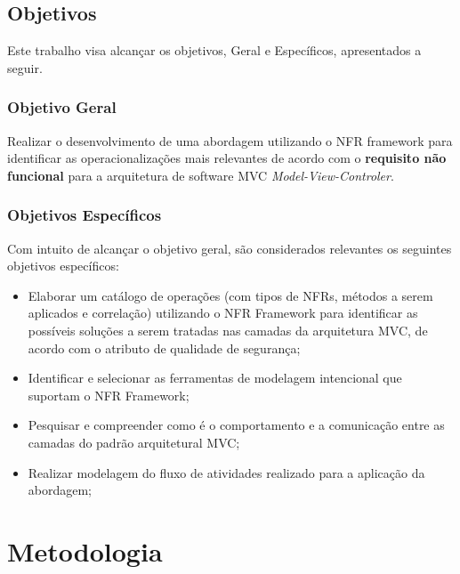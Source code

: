 \section{Objetivos}

Este trabalho visa alcançar os objetivos, Geral e Específicos, apresentados a seguir.  

\subsection{Objetivo Geral}

Realizar o desenvolvimento de uma abordagem utilizando o NFR framework para identificar as operacionalizações mais relevantes de acordo com o \textbf{requisito não funcional} para a arquitetura de software MVC \textit{Model-View-Controler}. 

\subsection{Objetivos Específicos}

Com intuito de alcançar o objetivo geral, são considerados relevantes os seguintes objetivos específicos:

\begin{itemize}
	
	\item Elaborar um catálogo de operações (com tipos de NFRs, métodos a serem aplicados e correlação) utilizando o NFR Framework para identificar as possíveis soluções a serem tratadas nas camadas da arquitetura MVC, de acordo com o atributo de qualidade de segurança;
	
	\item Identificar e selecionar as ferramentas de modelagem intencional que suportam o NFR Framework;
	
	\item Pesquisar e compreender como é o comportamento e a comunicação entre as camadas do padrão arquitetural MVC;
	
	\item Realizar modelagem do fluxo de atividades realizado para a aplicação da abordagem;
\end{itemize}

\chapter{Metodologia}

